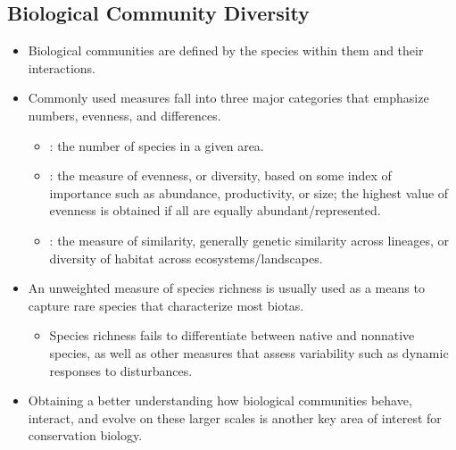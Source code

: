 \documentclass{inVerba-notes}
\begin{document}
\begin{itemize}
    \subsection{Biological Community Diversity}\label{Biological Community Diversity}
    \begin{itemize}
        \item Biological communities are defined by the species within them and their interactions.
        \item Commonly used measures fall into three major categories that emphasize numbers, evenness, and differences.
            \begin{itemize}
                \item {}: the number of species in a given area.
                \item {}: the measure of evenness, or diversity, based on some index of importance such as abundance, productivity, or size; the highest value of evenness is obtained if all are equally abundant/represented.
                \item {}: the measure of similarity, generally genetic similarity across lineages, or diversity of habitat across ecosystems/landscapes.
            \end{itemize}
        \item An unweighted measure of species richness is usually used as a means to capture rare species that characterize most biotas.
            \begin{itemize}
                \item Species richness fails to differentiate between native and nonnative species, as well as other measures that assess variability such as dynamic responses to disturbances. 
            \end{itemize}
        \item Obtaining a better understanding how biological communities behave, interact, and evolve on these larger scales is another key area of interest for conservation biology.
    \end{itemize}
    

\end{itemize}
\end{document}
